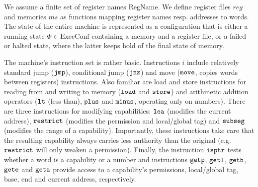 \documentclass[format=acmsmall, review=false, screen=true]{acmart}
\newcommand\lau[1]{{\color{purple} \sf \footnotesize {LS: #1}}\\}
\renewcommand\lau[1]{}
\newcommand{\var}[1]{\mathit{#1}}
\newcommand{\hs}{\var{ms}}
\newcommand{\ms}{\hs}
\newcommand{\reg}{\var{reg}}
\newcommand{\plaindom}[1]{\mathrm{#1}}
\newcommand{\ExecConfs}{\plaindom{ExecConf}}
\newcommand{\RegName}{\plaindom{RegName}}
\newcommand{\zinstr}[1]{\mathtt{#1}}
\newcommand{\oneinstr}[2]{
  \ifthenelse{\equal{#2}{}}
  {\zinstr{#1}}
  {\zinstr{#1} \; #2}
}
\newcommand{\jmp}[1]{\oneinstr{jmp}{#1}}
\newcommand{\twoinstr}[3]{
  \ifthenelse{\equal{#2#3}{}}
  {\zinstr{#1}}
  {\zinstr{#1} \; #2 \; #3}
}
\newcommand{\restricttwo}[2]{\twoinstr{restrict}{#1}{#2}}
\newcommand{\jnz}[2]{\twoinstr{jnz}{#1}{#2}}
\newcommand{\isptr}[2]{\twoinstr{isptr}{#1}{#2}}
\newcommand{\geta}[2]{\twoinstr{geta}{#1}{#2}}
\newcommand{\getb}[2]{\twoinstr{getb}{#1}{#2}}
\newcommand{\gete}[2]{\twoinstr{gete}{#1}{#2}}
\newcommand{\getp}[2]{\twoinstr{getp}{#1}{#2}}
\newcommand{\getl}[2]{\twoinstr{getl}{#1}{#2}}
\newcommand{\move}[2]{\twoinstr{move}{#1}{#2}}
\newcommand{\store}[2]{\twoinstr{store}{#1}{#2}}
\newcommand{\load}[2]{\twoinstr{load}{#1}{#2}}
\newcommand{\lea}[2]{\twoinstr{lea}{#1}{#2}}
\newcommand{\threeinstr}[4]{
  \ifthenelse{\equal{#2#3#4}{}}
  {\zinstr{#1}}
  {\zinstr{#1} \; #2 \; #3 \; #4}
}
\newcommand{\subseg}[3]{\threeinstr{subseg}{#1}{#2}{#3}}
\newcommand{\plus}[3]{\threeinstr{plus}{#1}{#2}{#3}}
\newcommand{\minus}[3]{\threeinstr{minus}{#1}{#2}{#3}}
\newcommand{\lt}[3]{\threeinstr{lt}{#1}{#2}{#3}}
\begin{document}
We assume a finite set of register names $\RegName$. We define register files
$\reg$ and memories $\ms$ as functions mapping register names resp. addresses to
words. The state of the entire machine is represented as a configuration that is
either a running state $\Phi \in \ExecConfs$ containing a memory and a register file,
or a failed or halted state, where the latter keeps hold of the final state of
memory.

The machine's instruction set is rather basic. Instructions $i$ include
relatively standard jump ($\jmp{}$), conditional jump ($\jnz{}{}$) and move
($\move{}{}$, copies words between registers) instructions. Also familiar are
load and store instructions for reading from and writing to memory ($\load{}{}$
and $\store{}{}$) and arithmetic addition operators ($\lt{}{}{}$ (less than), $\plus{}{}{}$ and
$\minus{}{}{}$, operating only on numbers). There are three instructions for
modifying capabilities: $\lea{}{}$ (modifies the current address),
$\restricttwo{}{}$ (modifies the permission and local/global tag) and
$\subseg{}{}{}$ (modifies the range of a capability). Importantly, these
instructions take care that the resulting capability always carries less
authority than the original (e.g. $\restricttwo{}{}$ will only weaken a permission).
Finally, the instruction $\isptr{}{}$ tests whether a word is a capability or a
number and instructions $\getp{}{}$, $\getl{}{}$, $\getb{}{}$, $\gete{}{}$ and
$\geta{}{}$ provide access to a capability's permissions, local/global tag, base,
end and current address, respectively.
\end{document}
